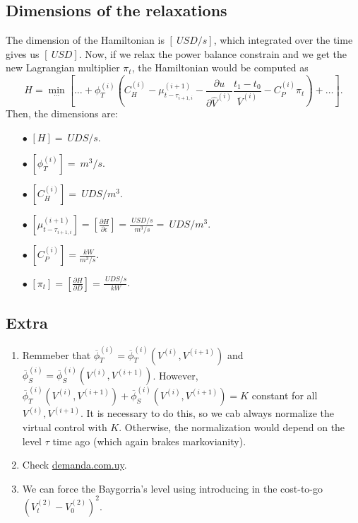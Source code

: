 \documentclass[12pt]{article}
\theoremstyle{definition}
\theoremstyle{remark}
\begin{document}
\subsection*{Dimensions of the relaxations}

The dimension of the Hamiltonian is $\left[\SI{}{USD/s}\right]$, which integrated over the time gives us $\left[\SI{}{USD}\right]$. Now, if we relax the power balance constrain and we get the new Lagrangian multiplier $\pi_t$, the Hamiltonian would be computed as
\begin{equation*}
H=\min_{\dots}\left[\dots+\phi_T^{(i)}\left(C_H^{(i)}-\mu^{(i+1)}_{t-\tau_{i+1,i}}-\frac{\partial u}{\partial\hat{V}^{(i)}}\frac{t_1-t_0}{\overline{V}^{(i)}}-C_P^{(i)}\pi_t\right)+\dots\right].
\end{equation*}
Then, the dimensions are:
\begin{enumerate}

\item[$\bullet$] $\left[H\right]=\SI{}{UDS/s}$.
\item[$\bullet$] $\left[\phi_T^{(i)}\right]=\SI{}{m^3/s}$.
\item[$\bullet$] $\left[C_H^{(i)}\right]=\SI{}{UDS/m^3}$.
\item[$\bullet$] $\left[\mu^{(i+1)}_{t-\tau_{i+1,i}}\right]=\left[\frac{\partial H}{\partial\epsilon}\right]=\frac{\SI{}{USD/s}}{\SI{}{m^3/s}}=\SI{}{UDS/m^3}$.
\item[$\bullet$] $\left[C_P^{(i)}\right]=\frac{\SI{}{kW}}{m^3/s}$.
\item[$\bullet$] $\left[\pi_t\right]=\left[\frac{\partial H}{\partial D}\right]=\frac{\SI{}{UDS/s}}{\SI{}{kW}}$.

\end{enumerate}

\subsection*{Extra}

\begin{enumerate}

\item Remmeber that $\overline{\phi}_T^{(i)}=\overline{\phi}_T^{(i)}(V^{(i)},V^{(i+1)})$ and $\overline{\phi}_S^{(i)}=\overline{\phi}_S^{(i)}(V^{(i)},V^{(i+1)})$. However, $\overline{\phi}_T^{(i)}(V^{(i)},V^{(i+1)})+\overline{\phi}_S^{(i)}(V^{(i)},V^{(i+1)})=K$ constant for all $V^{(i)},V^{(i+1)}$. It is necessary to do this, so we cab always normalize the virtual control with $K$. Otherwise, the normalization would depend on the level $\tau$ time ago (which again brakes markovianity).

\item Check \url{demanda.com.uy}.

\item We can force the Baygorria's level using introducing in the cost-to-go $\left(V_t^{(2)}-V_0^{(2)}\right)^2$.

\end{enumerate}
\end{document}
